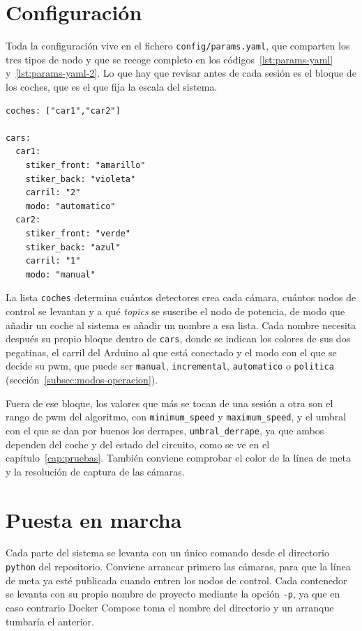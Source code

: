 \section{Configuración}
\label{sec:configuracion-anexo}

Toda la configuración vive en el fichero \texttt{config/params.yaml}, que comparten los tres tipos de nodo y que se recoge completo en los códigos~\ref{lst:params-yaml} y~\ref{lst:params-yaml-2}. Lo que hay que revisar antes de cada sesión es el bloque de los coches, que es el que fija la escala del sistema.

\begin{lstlisting}[style=codigo, language=yamlsimple, caption={Bloque del fichero de parámetros donde se definen los coches}, label={lst:anexo-coches}]
coches: ["car1","car2"]

cars:
  car1:
    stiker_front: "amarillo"
    stiker_back: "violeta"
    carril: "2"
    modo: "automatico"
  car2:
    stiker_front: "verde"
    stiker_back: "azul"
    carril: "1"
    modo: "manual"
\end{lstlisting}

La lista \texttt{coches} determina cuántos detectores crea cada cámara, cuántos nodos de control se levantan y a qué \emph{topics} se suscribe el nodo de potencia, de modo que añadir un coche al sistema es añadir un nombre a esa lista. Cada nombre necesita después su propio bloque dentro de \texttt{cars}, donde se indican los colores de sus dos pegatinas, el carril del Arduino al que está conectado y el modo con el que se decide su \gls{pwm}, que puede ser \texttt{manual}, \texttt{incremental}, \texttt{automatico} o \texttt{politica} (sección~\ref{subsec:modos-operacion}).

Fuera de ese bloque, los valores que más se tocan de una sesión a otra son el rango de \gls{pwm} del algoritmo, con \texttt{minimum\_speed} y \texttt{maximum\_speed}, y el umbral con el que se dan por buenos los derrapes, \texttt{umbral\_derrape}, ya que ambos dependen del coche y del estado del circuito, como se ve en el capítulo~\ref{cap:pruebas}. También conviene comprobar el color de la línea de meta y la resolución de captura de las cámaras.

\section{Puesta en marcha}
\label{sec:instrucciones-execucion}

Cada parte del sistema se levanta con un único comando desde el directorio \texttt{python} del repositorio. Conviene arrancar primero las cámaras, para que la línea de meta ya esté publicada cuando entren los nodos de control. Cada contenedor se levanta con su propio nombre de proyecto mediante la opción \texttt{-p}, ya que en caso contrario Docker Compose toma el nombre del directorio y un arranque tumbaría el anterior.

